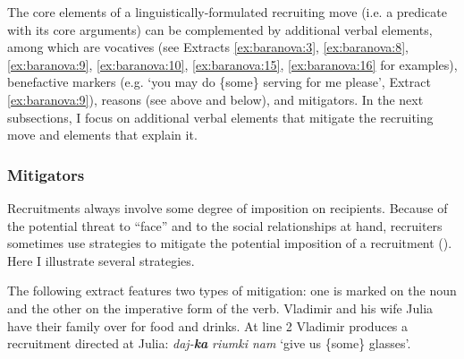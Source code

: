 \documentclass[output=paper,modfonts,nonflat]{langsci/langscibook}
\begin{document}
The core elements of a linguistically-formulated recruiting move (i.e. a predicate with its core arguments) can be complemented by additional verbal elements, among which are vocatives (see Extracts \ref{ex:baranova:3}, \ref{ex:baranova:8}, \ref{ex:baranova:9}, \ref{ex:baranova:10}, \ref{ex:baranova:15}, \ref{ex:baranova:16} for examples), benefactive markers (e.g. ‘you may do \{some\} serving for me please’, Extract \ref{ex:baranova:9}), reasons (see  above and  below), and mitigators. In the next subsections, I focus on additional verbal elements that mitigate the recruiting move and elements that explain it.

\subsubsection{Mitigators}\label{sec:baranova:3.4.1}

Recruitments always involve some degree of imposition on recipients. Because of the potential threat to “face” and to the social relationships at hand, recruiters sometimes use strategies to mitigate the potential imposition of a recruitment (\citealt{BrownLevinson1987}). Here I illustrate several strategies.

The following extract features two types of mitigation: one is marked on the noun and the other on the imperative form of the verb. Vladimir and his wife Julia have their family over for food and drinks. At line 2 Vladimir produces a recruitment directed at Julia: \textit{daj-}\textbf{\textit{ka}} \textit{riumki nam} ‘give us \{some\} glasses’.
\end{document}
